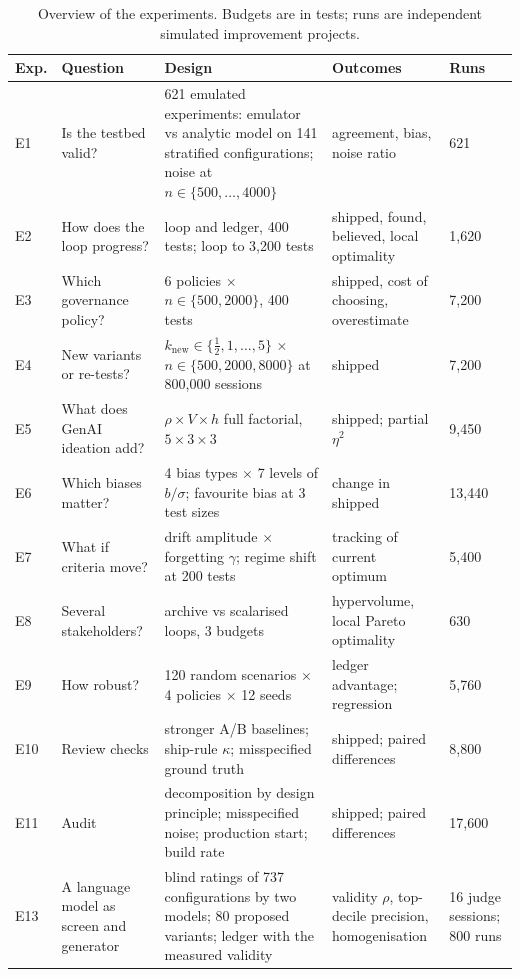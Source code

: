 \documentclass[preprint,12pt,authoryear]{elsarticle}
\theoremstyle{definition}
\begin{document}
\begin{table}[!tbp]
\caption{Overview of the experiments. Budgets are in tests; runs are independent simulated improvement projects.}
\label{tab:experiments}
\centering\footnotesize
\begin{tabularx}{\textwidth}{@{}P{0.75cm}P{2.45cm}LLP{1.1cm}@{}}
\toprule
Exp. & Question & Design & Outcomes & Runs\\
\midrule
E1 & Is the testbed valid? & 621 emulated experiments: emulator vs analytic model on 141 stratified configurations; noise at $n\in\{500,\ldots,4000\}$ & agreement, bias, noise ratio & 621\\
E2 & How does the loop progress? & loop and ledger, 400 tests; loop to 3,200 tests & shipped, found, believed, local optimality & 1,620\\
E3 & Which governance policy? & 6 policies $\times$ $n\in\{500,2000\}$, 400 tests & shipped, cost of choosing, overestimate & 7,200\\
E4 & New variants or re-tests? & $k_{\text{new}}\in\{\frac12,1,\ldots,5\}$ $\times$ $n\in\{500,2000,8000\}$ at 800,000 sessions & shipped & 7,200\\
E5 & What does GenAI ideation add? & $\rho\times V\times h$ full factorial, $5\times3\times3$ & shipped; partial $\eta^2$ & 9,450\\
E6 & Which biases matter? & 4 bias types $\times$ 7 levels of $b/\sigma$; favourite bias at 3 test sizes & change in shipped & 13,440\\
E7 & What if criteria move? & drift amplitude $\times$ forgetting $\gamma$; regime shift at 200 tests & tracking of current optimum & 5,400\\
E8 & Several stakeholders? & archive vs scalarised loops, 3 budgets & hypervolume, local Pareto optimality & 630\\
E9 & How robust? & 120 random scenarios $\times$ 4 policies $\times$ 12 seeds & ledger advantage; regression & 5,760\\
E10 & Review checks & stronger A/B baselines; ship-rule $\kappa$; misspecified ground truth & shipped; paired differences & 8,800\\
E11 & Audit & decomposition by design principle; misspecified noise; production start; build rate & shipped; paired differences & 17,600\\
E13 & A language model as screen and generator & blind ratings of 737 configurations by two models; 80 proposed variants; ledger with the measured validity & validity $\rho$, top-decile precision, homogenisation & 16 judge sessions; 800 runs\\
\bottomrule
\end{tabularx}
\end{table}
\end{document}
